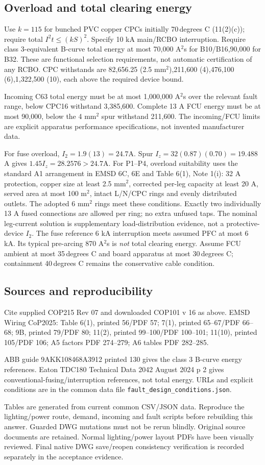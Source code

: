 \subsection*{Overload and total clearing energy}
Use $k=115$ for bunched PVC copper CPCs initially 70\,degrees C (11(2)(c));  require total $I^2t\le(kS)^2$. Specify 10 kA main/RCBO interruption. Require class 3-equivalent B-curve total energy at most 70,000 A$^2$s for B10/B16,90,000 for B32. These are functional selection requirements, not automatic certification of any RCBO. CPC withstands are 82,656.25 (2.5 mm$^2$),211,600 (4),476,100 (6),1,322,500 (10), each above the required device bound.

Incoming C63 total energy must be at most 1,000,000 A$^2$s over the relevant fault range, below CPC16 withstand 3,385,600. Complete 13 A FCU energy must be at most 90,000, below the 4 mm$^2$ spur withstand 211,600. The incoming/FCU limits are explicit apparatus performance specifications, not invented manufacturer data.

For fuse overload, $I_2=1.9(13)=24.7$A. Spur $I_z=32(0.87)(0.70)=19.488$A gives $1.45I_z=28.2576>24.7$A. For P1--P4, overload suitability uses the standard A1 arrangement in EMSD 6C, 6E and Table 6(1), Note 1(i): 32 A protection, copper size at least 2.5 mm$^2$, corrected per-leg capacity at least 20 A, served area at most 100 m$^2$, intact L/N/CPC rings and evenly distributed outlets. The adopted 6 mm$^2$ rings meet these conditions. Exactly two individually 13 A fused connections are allowed per ring; no extra unfused taps. The nominal leg-current solution is supplementary load-distribution evidence, not a protective-device $I_2$. The fuse reference 6 kA interruption meets assumed PFC at most 6 kA. Its typical pre-arcing 870 A$^2$s is \emph{not} total clearing energy. Assume FCU ambient at most 35\,degrees C and board apparatus at most 30\,degrees C;  containment 40\,degrees C remains the conservative cable condition.
\clearpage
\subsection*{Sources and reproducibility}
Cite supplied COP215 Rev 07 and downloaded COP101 v 16 as above. EMSD Wiring CoP2025: Table 6(1), printed 56/PDF 57; 7(1), printed 65--67/PDF 66--68; 9B, printed 79/PDF 80; 11(2), printed 99--100/PDF 100--101; 11(10), printed 105/PDF 106;  A5 factors PDF 274--279;  A6 tables PDF 282--285.

ABB guide 9AKK108468A3912 printed 130 gives the class 3 B-curve energy references. Eaton TDC180 Technical Data 2042 August 2024 p 2 gives conventional-fusing/interruption references, not total energy. URLs and explicit conditions are in the common data file \nolinkurl{fault_design_conditions.json}.

Tables are generated from current common CSV/JSON data. Reproduce the lighting/power route, demand, incoming and fault scripts before rebuilding this answer. Guarded DWG mutations must not be rerun blindly. Original source documents are retained. Normal lighting/power layout PDFs have been visually reviewed. Final native DWG save/reopen consistency verification is recorded separately in the acceptance evidence.
